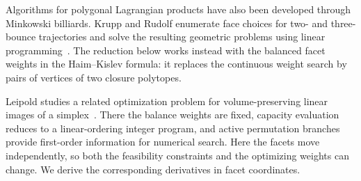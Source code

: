 Algorithms for polygonal Lagrangian products have also been developed through
Minkowski billiards. Krupp and Rudolf enumerate face choices for two- and
three-bounce trajectories and solve the resulting geometric problems using
linear programming~\cite[Section~7.3]{KruppRudolf2022}.
The reduction below works instead with the balanced facet weights in the
Haim--Kislev formula: it replaces the continuous weight search by pairs of
vertices of two closure polytopes.

Leipold studies a related optimization problem for volume-preserving linear
images of a simplex~\cite[Sections~9.2, 11.3, and~12.3]{Leipold2026}.
There the balance weights are fixed, capacity evaluation reduces to a
linear-ordering integer program, and active permutation branches provide
first-order information for numerical search. Here the facets move
independently, so both the feasibility constraints and the optimizing weights
can change. We derive the corresponding derivatives in facet coordinates.
